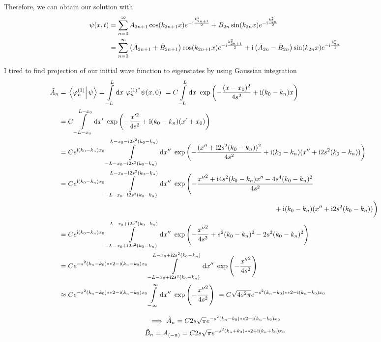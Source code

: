 \documentclass[12pt]{article}
\begin{document}
Therefore, we can obtain our solution with\begin{align}
\psi(x,t) & = \sum_{n=0}^\infty A_{2n+1} \cos(k_{2n+1}x) e^{-\mathrm i \frac{k_{2n+1}^2}{2}} + B_{2n} \sin(k_{2n}x) e^{-\mathrm i \frac{k_{2n}^2}{2}} \\ 
& = \sum_{n=0}^\infty \left(\tilde A_{2n+1}+\tilde B_{2n+1}\right) \cos(k_{2n+1}x)e^{-\mathrm i \frac{k_{2n+1}^2}{2}} + \mathrm i\left(\tilde A_{2n}-\tilde B_{2n}\right) \sin(k_{2n}x)  e^{-\mathrm i \frac{k_{2n}^2}{2}}
\end{align}

I tired to find projection of our initial wave function to eigenstates by using Gaussian integration \begin{align*}
\tilde A_n & = \braket{\varphi_n^{(1)}}{\psi} = \integral[-L][L]{x}{{\varphi_n^{(1)}}^*\psi(x,0)} = C \integral[-L][L]{x}{\exp\left(-\frac{(x-x_0)^2}{4s^2} + \imagu (k_0-k_n) x\right)} \\
& = C\integral[-L-x_0][L-x_0]{x'}{\exp\left(-\frac{x'^2}{4s^2} + \imagu (k_0-k_n) (x'+x_0)\right)} \\
& = Ce^{\imagu (k_0-k_n)x_0} \integral[-L-x_0-\imagu 2s^2(k_0-k_n)][L-x_0-\imagu 2s^2(k_0-k_n)]{x''}{\exp\left(-\frac{(x''+\imagu 2s^2(k_0-k_n))^2}{4s^2} + \imagu (k_0-k_n) (x''+\imagu 2s^2(k_0-k_n))\right)} \\
& =Ce^{\imagu (k_0-k_n)x_0} \integral[-L-x_0-\imagu 2s^2(k_0-k_n)][L-x_0-\imagu 2s^2(k_0-k_n)]{x''}{\exp\left(-\frac{{x''}^2+\imagu 4s^2(k_0-k_n)x'' - 4s^4(k_0-k_n)^2}{4s^2}\right. \\ & \hspace*{11cm}+\imagu (k_0-k_n) (x''+\imagu 2s^2(k_0-k_n))\bigg)} \\
& =Ce^{\imagu (k_0-k_n)x_0} \integral[-L-x_0+\imagu 2s^2(k_0-k_n)][L-x_0+\imagu 2s^2(k_0-k_n)]{x''}{\exp\left(-\frac{{x''}^2}{4s^2}+ s^2(k_0-k_n)^2-2s^2(k_0-k_n)^2\right)}  \\
& = Ce^{- s^2 (k_n-k_0)**2 - \imagu (k_n-k_0)x_0} \integral[-L-x_0+\imagu 2s^2(k_0-k_n)][L-x_0+\imagu 2s^2(k_0-k_n)]{x''}{\exp\left(-\frac{{x''}^2}{4s^2}\right)} \\
& \approx C e^{- s^2 (k_n-k_0)**2 - \imagu (k_n-k_0)x_0} \integral[-\infty][\infty]{x''}{\exp\left(-\frac{{x''}^2}{4s^2}\right)} = C \sqrt{{4s^2\pi}}e^{- s^2 (k_n-k_0)**2 - \imagu (k_n-k_0)x_0}
\end{align*}

\begin{gather}
\implies \tilde A_n = C 2s\sqrt{\pi} e^{- s^2 (k_n-k_0)**2 - \mathrm i (k_n-k_0)x_0} \\ 
\tilde B_n = A_{(-n)} = C 2s\sqrt{\pi} e^{- s^2 (k_n+k_0)**2 + \mathrm i (k_n+k_0)x_0}
\end{gather}




\end{document}
